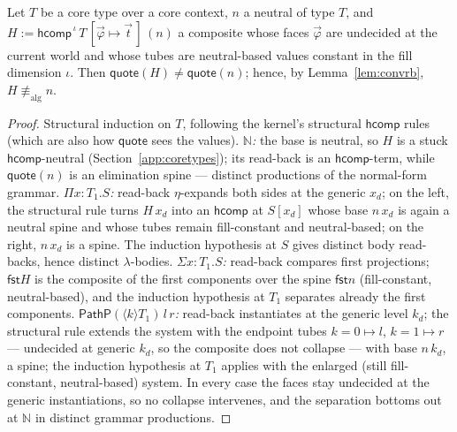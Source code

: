 \documentclass{lmcs}
\newcommand{\hcomp}{\mathsf{hcomp}}
\newcommand{\aconv}{\equiv_{\mathrm{alg}}}
\providecommand{\fst}{}\renewcommand{\fst}{\mathsf{fst}}
\newcommand{\quo}{\mathsf{quote}}
\begin{document}
\begin{lem}[$\hcomp$/spine separation]\label{lem:sepschema}
  Let $T$ be a core type over a core context, $n$ a neutral of type
  $T$, and
  $H := \hcomp^{\,\iota}\,T\,[\vec\varphi \mapsto \vec t\,]\,(n)$ a
  composite whose faces $\vec\varphi$ are undecided at the current
  world and whose tubes are neutral-based values constant in the
  fill dimension $\iota$.  Then $\quo(H) \ne \quo(n)$; hence, by
  Lemma~\ref{lem:convrb}, $H \not\aconv n$.
\end{lem}
\begin{proof}
  Structural induction on $T$, following the kernel's structural
  $\hcomp$ rules (which are also how $\quo$ sees the values).
  \emph{$\mathbb{N}$:} the base is neutral, so $H$ is a stuck
  $\hcomp$-neutral (Section~\ref{app:coretypes}); its read-back is
  an $\hcomp$-term, while $\quo(n)$ is an elimination spine ---
  distinct productions of the normal-form grammar.
  \emph{$\Pi x{:}T_1.S$:} read-back $\eta$-expands both sides at
  the generic $x_d$; on the left, the structural rule turns
  $H\,x_d$ into an $\hcomp$ at $S[x_d]$ whose base $n\,x_d$ is
  again a neutral spine and whose tubes remain fill-constant and
  neutral-based; on the right, $n\,x_d$ is a spine.  The induction
  hypothesis at $S$ gives distinct body read-backs, hence distinct
  $\lambda$-bodies.
  \emph{$\Sigma x{:}T_1.S$:} read-back compares first projections;
  $\fst H$ is the composite of the first components over the spine
  $\fst n$ (fill-constant, neutral-based), and the induction
  hypothesis at $T_1$ separates already the first components.
  \emph{$\mathsf{PathP}(\langle k \rangle T_1)\,l\,r$:} read-back
  instantiates at the generic level $k_d$; the structural rule
  extends the system with the endpoint tubes $k{=}0 \mapsto l$,
  $k{=}1 \mapsto r$ --- undecided at generic $k_d$, so the
  composite does not collapse --- with base $n\,k_d$, a spine; the
  induction hypothesis at $T_1$ applies with the enlarged (still
  fill-constant, neutral-based) system.
  In every case the faces stay undecided at the generic
  instantiations, so no collapse intervenes, and the separation
  bottoms out at $\mathbb{N}$ in distinct grammar productions.
\end{proof}
\end{document}
